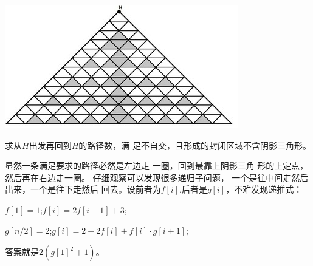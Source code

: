 \begin{prob}
	\begin{center}
		\includegraphics{15E.png}
	\end{center}
	\par
	求从$H$出发再回到$H$的路径数，满
	足不自交，且形成的封闭区域不含阴影三角形。
\end{prob}

\begin{sol}
	显然一条满足要求的路径必然是左边走
	一圈，回到最靠上阴影三角
	形的上定点，然后再在右边走一圈。
	仔细观察可以发现很多递归子问题，
	一个是往中间走然后出来，一个是往下走然后
	回去。设前者为$f[i]$,后者是$g[i]$，不难发现递推式：
	\par
	$f[1]=1$;$f[i]=2f[i-1]+3$;
	\par
	$g[n/2]=2$;$g[i]=2+2f[i]+f[i] \cdot g[i+1]$;
	\par
	答案就是$2(g[1]^2+1)$。
\end{sol}
